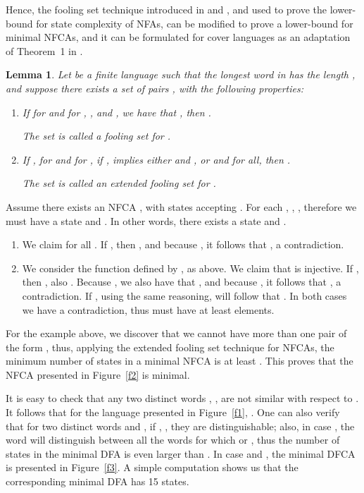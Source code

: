 \documentclass[submission,copyright,creativecommons]{eptcs}
\newtheorem{lemma}{Lemma}
\newenvironment{proof}[1][Proof]{\begin{trivlist}
\item[\hskip \labelsep {\bfseries #1}]}{\end{trivlist}}
\begin{document}
Hence, the fooling set technique introduced in \cite{Chrobak} and \cite{gramlich}, and used to prove the lower-bound 
for state complexity of NFAs, can be modified to prove 
a lower-bound for minimal NFCAs, and it can be formulated  for cover languages
as an adaptation of Theorem~1 in \cite{GruberHolzerNFAHard}.
\begin{lemma}
\label{lcfst}
Let  be a finite language such that the longest word in  has the length , 
and suppose there  exists a set of pairs , with the following properties:
\begin{enumerate}
 \item 
  \label{scfst}
  If  for  and 
for , , and , we have that 
, then . 

The set  is called {\em a fooling set} for .
 \item 
 \label{cfstext}
If , for  and for , if , implies 
either  and , 
or  and  for all, 
 then . 

The set  is called {\em an extended fooling set} for .
\end{enumerate}
\end{lemma}
\begin{proof}
Assume there exists an NFCA , with  states accepting .
For each , , , therefore we must have a state  
and .
In other words, there exists a state  and . 
\begin{enumerate}
 \item We claim   for all .
If ,
then , and because , it follows that 
  , a contradiction.
\item We consider the function  
defined by ,  as above.
We claim that  is injective.
If , then
,
also 
.
Because , we also have that ,
and because , it follows that , a contradiction.
If , using the same reasoning, will follow that .
In both cases we have a contradiction, thus  must have at least  elements.
\end{enumerate}
\end{proof}

For the example above, we discover that we cannot have more than one pair 
of the form , thus, applying the extended fooling set technique for NFCAs,
 the minimum number of states in a minimal 
NFCA is at least . 
This proves that the NFCA presented in Figure~\ref{f2} is minimal.


It is easy to check that any two distinct words , , 
are not similar with respect to . It follows that for the language presented in 
Figure~\ref{f1}, . One can also verify that for two distinct words
 and ,
if  , , they are distinguishable;
also, in case 
, the word  will distinguish between all the words for which
 or , thus the number of states in the minimal DFA is even
 larger than  .
In case   and , the minimal DFCA is presented in Figure~\ref{f3}. A simple 
computation shows us that the corresponding minimal DFA has 15 states.
\end{document}
